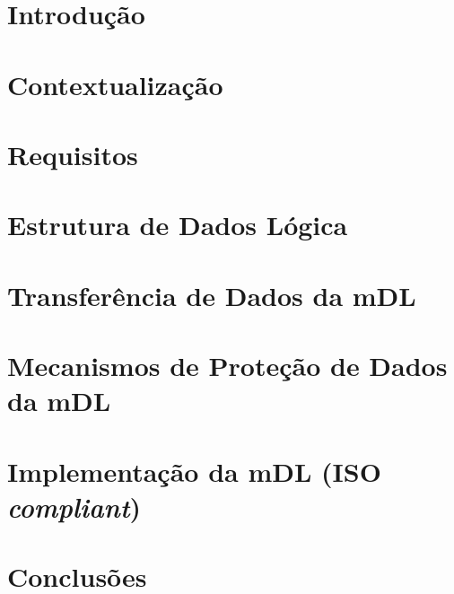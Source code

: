 \documentclass[11pt]{article}
\begin{document}
\newpage

\tableofcontents

\newpage

\section{Introdução}


\section{Contextualização}


\section{Requisitos}


\section{Estrutura de Dados Lógica}


\section{Transferência de Dados da mDL}


\section{Mecanismos de Proteção de Dados da mDL}


\section{Implementação da mDL (ISO \textit{compliant})}


\newpage
\section{Conclusões}



\newpage


\end{document}
